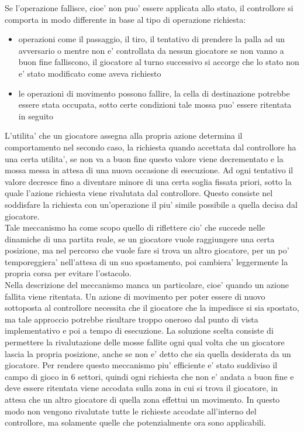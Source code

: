 Se l'operazione fallisce, cioe' non puo' essere applicata allo stato, il controllore si comporta in modo differente in base al tipo di operazione richiesta:

\begin{itemize}
	\item operazioni come il passaggio, il tiro, il tentativo di prendere la palla ad un avversario o mentre non e' controllata da nessun giocatore se non vanno a buon fine falliscono, il giocatore al turno successivo si accorge che lo stato non e' stato modificato come aveva richiesto
	\item le operazioni di movimento possono fallire, la cella di destinazione potrebbe essere stata occupata, sotto certe condizioni tale mossa puo' essere ritentata in seguito
\end{itemize}

L'utilita' che un giocatore assegna alla propria azione determina il comportamento nel secondo caso, la richiesta quando accettata dal controllore ha una certa utilita', se non va a buon fine questo valore viene decrementato e la mossa messa in attesa di una nuova occasione di esecuzione. Ad ogni tentativo il valore decresce fino a diventare minore di una certa soglia fissata priori, sotto la quale l'azione richiesta viene rivalutata dal controllore. Questo consiste nel soddisfare la richiesta con un'operazione il piu' simile possibile a quella decisa dal giocatore.\\

Tale meccanismo ha come scopo quello di riflettere cio' che succede nelle dinamiche di una partita reale, se un giocatore vuole raggiungere una certa posizione, ma nel percorso che vuole fare si trova un altro giocatore, per un po' temporeggiera' nell'attesa di un suo spostamento, poi cambiera' leggermente la propria corsa per evitare l'ostacolo.\\

Nella descrizione del meccanismo manca un particolare, cioe' quando un azione fallita viene ritentata. Un azione di movimento per poter essere di nuovo sottoposta al controllore necessita che il giocatore che la impedisce si sia spostato, ma tale approccio potrebbe risultare troppo oneroso dal punto di vista implementativo e poi a tempo di esecuzione. La soluzione scelta consiste di permettere la rivalutazione delle mosse fallite ogni qual volta che un giocatore lascia la propria posizione, anche se non e' detto che sia quella desiderata da un giocatore. Per rendere questo meccanismo piu' efficiente e' stato suddiviso il campo di gioco in 6 settori, quindi ogni richiesta che non e' andata a buon fine e deve essere ritentata viene accodata sulla zona in cui si trova il giocatore, in attesa che un altro giocatore di quella zona effettui un movimento. In questo modo non vengono rivalutate tutte le richieste accodate all'interno del controllore, ma solamente quelle che potenzialmente ora sono applicabili.\\

